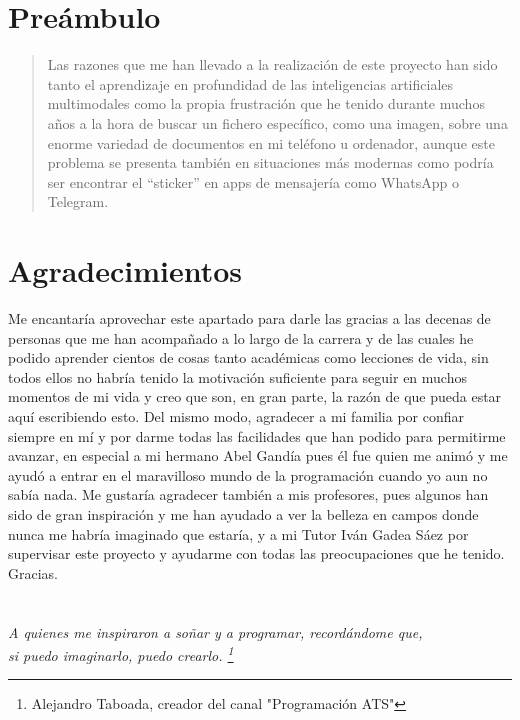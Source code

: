 
\chapter*{Preámbulo}
\thispagestyle{empty}
\begin{quote}
Las razones que me han llevado a la realización de este proyecto han sido tanto el aprendizaje en profundidad de las inteligencias artificiales multimodales como la propia frustración que he tenido durante muchos años a la hora de buscar un fichero específico, como una imagen, sobre una enorme variedad de documentos en mi teléfono u ordenador, aunque este problema se presenta también en situaciones más modernas como podría ser encontrar el “sticker” en apps de mensajería como WhatsApp o Telegram.
\end{quote}


\cleardoublepage %
\chapter*{Agradecimientos}
\thispagestyle{empty}

Me encantaría aprovechar este apartado para darle las gracias a las decenas de personas que me han acompañado a lo largo de la carrera y de las cuales he podido aprender cientos de cosas tanto académicas como lecciones de vida, sin todos ellos no habría tenido la motivación suficiente para seguir en muchos momentos de mi vida y creo que son, en gran parte, la razón de que pueda estar aquí escribiendo esto. Del mismo modo, agradecer a mi familia por confiar siempre en mí y por darme todas las facilidades que han podido para permitirme avanzar, en especial a mi hermano Abel Gandía pues él fue quien me animó y me ayudó a entrar en el maravilloso mundo de la programación cuando yo aun no sabía nada.
Me gustaría agradecer también a mis profesores, pues algunos han sido de gran inspiración y me han ayudado a ver la belleza en campos donde nunca me habría imaginado que estaría, y a mi Tutor Iván Gadea Sáez por supervisar este proyecto y ayudarme con todas las preocupaciones que he tenido.
Gracias.

\cleardoublepage %
\chapter*{}
\setlength{\leftmargin}{0.5\textwidth}
\setlength{\parsep}{0cm}
\addtolength{\topsep}{0.5cm}
\begin{flushright}
\small\em{
A quienes me inspiraron a soñar y a programar, recordándome que,\\
si puedo imaginarlo, puedo crearlo. \footnote{Alejandro Taboada, creador del canal "Programación ATS"}
}
\end{flushright}
